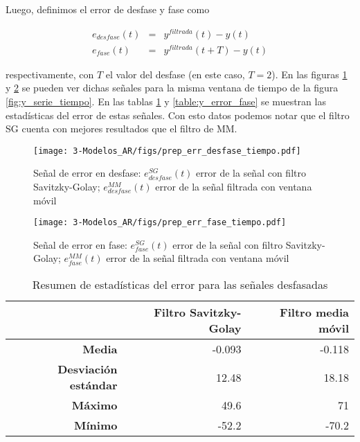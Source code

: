 Luego, definimos el error de desfase y fase como

\begin{eqnarray}
	e_{desfase}(t) & = & y^{filtrada}(t) - y(t) \\
	e_{fase}(t)    & = & y^{filtrada}(t+T) - y(t)
\end{eqnarray}

respectivamente, con $T$ el valor del desfase (en este caso, $T=2$). En las figuras \ref{fig:y_error_desfase} y \ref{fig:y_error_fase} se pueden ver dichas señales para la misma ventana de tiempo de la figura \ref{fig:y_serie_tiempo}. En las tablas \ref{table:y_error_desfase} y \ref{table:y_error_fase} se muestran las estadísticas del error de estas señales. Con esto datos podemos notar que el filtro SG cuenta con mejores resultados que el filtro de MM.

\begin{figure}[H]
	\centering
	\texttt{[image: 3-Modelos\_AR/figs/prep\_err\_desfase\_tiempo.pdf]}
	\caption{Señal de error en desfase: $e^{SG}_{desfase}(t)$ error de la señal con filtro Savitzky-Golay; $e^{MM}_{desfase}(t)$ error de la señal filtrada con ventana móvil}
	\label{fig:y_error_desfase}
\end{figure}

\begin{figure}[H]
	\centering
	\texttt{[image: 3-Modelos\_AR/figs/prep\_err\_fase\_tiempo.pdf]}
	\caption{Señal de error en fase: $e^{SG}_{fase}(t)$ error de la señal con filtro Savitzky-Golay; $e^{MM}_{fase}(t)$ error de la señal filtrada con ventana móvil}
	\label{fig:y_error_fase}
\end{figure}


\begin{table}[H]
	\centering
	\begin{tabular}{rr|r}
		\hline \hline
		&	Filtro Savitzky-Golay & Filtro media móvil \\
		\hline
		\textbf{Media}   				& -0.093	& -0.118 	\\
		\textbf{Desviación estándar}    & 12.48  	& 18.18  	\\
		\textbf{Máximo} 				& 49.6 		& 71 		\\
		\textbf{Mínimo} 				& -52.2 	& -70.2 	\\ 
		\hline \hline
	\end{tabular}
	\caption{Resumen de estadísticas del error para las señales desfasadas}
	\label{table:y_error_desfase}
\end{table}



